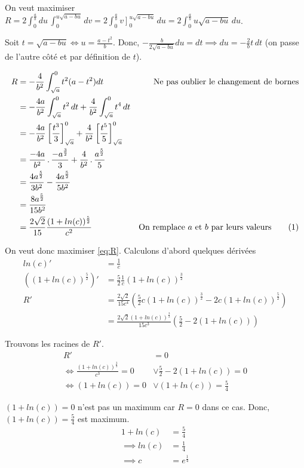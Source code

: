 On veut maximiser $R = 2\int_0^{\frac{a}{b}}du\,\int_0^{u\sqrt{a-bu}} dv = 2\int_0^{\frac{a}{b}} \left. v\right]_0^{u\sqrt{a-bu}}\,du = 2\int_0^{\frac{a}{b}} u\sqrt{a-bu}\,du$.

Soit $t=\sqrt{a-bu} \iff u = \frac{a-t^2}{b}$. Donc, $-\frac{b}{2\sqrt{a-bu}} du = dt \implies du = -\frac{2}{b}t\,dt$ (on passe de l'autre côté et par définition de $t$).

\begin{align*}
    R &= -\frac{4}{b^2}\int_{\sqrt{a}}^0 t^2(a-t^2)dt & \text{Ne pas oublier le changement de bornes}\\
    &= -\frac{4a}{b^2}\int_{\sqrt{a}}^0 t^2\,dt + \frac{4}{b^2}\int_{\sqrt{a}}^0 t^4\,dt\\
    &= -\frac{4a}{b^2}\left[\frac{t^3}{3}\right]_{\sqrt{a}}^0 + \frac{4}{b^2}\left[\frac{t^5}{5}\right]_{\sqrt{a}}^0\\
    &= \frac{-4a}{b^2}\,.\,\frac{-a^\frac{3}{2}}{3} + \frac{4}{b^2}\,.\,\frac{a^{\frac{5}{2}}}{5}\\
    &= \frac{4a^{\frac{5}{2}}}{3b^2} - \frac{4a^{\frac{5}{2}}}{5b^2}\\
    &= \frac{8a^{\frac{5}{2}}}{15b^2}\\
    &= \frac{2\sqrt{2}}{15}\frac{(1+ln(c))^{\frac{5}{2}}}{c^2} & \text{On remplace $a$ et $b$ par leurs valeurs}\stepcounter{equation}\tag{\theequation}\label{eq:R}
\end{align*}

On veut donc maximiser \eqref{eq:R}. Calculons d'abord quelques dérivées
\begin{align*}
    ln(c)' &= \frac{1}{c}\\
    ((1+ln(c))^{\frac{5}{2}})' &= \frac{5}{2}\frac{1}{c}(1+ln(c))^{\frac{3}{2}}\\
    R' &= \frac{2\sqrt{2}}{15c^4}\left(\frac{5}{2}c(1+ln(c))^\frac{3}{2} - 2c(1+ln(c))^{\frac{5}{2}}\right)\\
    &= \frac{2\sqrt{2}(1+ln(c))^{\frac{3}{2}}}{15c^3}\left(\frac{5}{2} - 2(1+ln(c))\right)
\end{align*}

Trouvons les racines de $R'$.
\begin{align*}
    R'&=0\\
    \iff \frac{(1+ln(c))^{\frac{3}{2}}}{c^3} = 0 &\vee \frac{5}{2} - 2(1+ln(c)) = 0\\
    \iff (1+ln(c)) = 0 &\vee (1+ln(c)) = \frac{5}{4}
\end{align*}

$(1+ln(c))=0$ n'est pas un maximum car $R=0$ dans ce cas. Donc, $(1+ln(c)) = \frac{5}{4}$ est maximum.
\begin{align*}
    1+ln(c) &= \frac{5}{4}\\
    \implies ln(c) &= \frac{1}{4}\\
    \implies c &= e^{\frac{1}{4}}
\end{align*}

